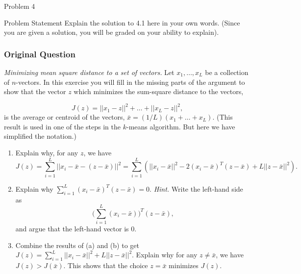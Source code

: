 \begin{problem}{Problem 4}
    \begin{statement}{Problem Statement}
        Explain the solution to 4.1  here in your own words. (Since you are given a solution, you will be graded on your ability to explain).

        \subsubsection*{Original Question}

        \textit{Minimizing mean square distance to a set of vectors.} Let $x_{1}, \dots, x_{L}$ be a collection of $n$-vectors. In this exercise you will fill in the missing parts of the argument to 
        show that the vector $z$ which minimizes the sum-square distance to the vectors,

        \begin{equation*}
            J(z) = ||x_{1} - z||^{2} + \dots + ||x_{L} - z||^{2},
        \end{equation*}
        is the average or centroid of the vectors, $\bar{x} = (1/L) (x_{1} + \dots + x_{L})$. (This result is used in one of the steps in the $k$-means algorithm. But here we have simplified the notation.)

        \begin{enumerate}[label = (\alph*)]
            \item Explain why, for any $z$, we have
            \begin{equation*}
                J(z) = \sum^{L}_{i = 1} ||x_{i} - \bar{x} - (z - \bar{x})||^{2} = \sum^{L}_{i = 1} (||x_{i} - \bar{x}||^{2} - 2(x_{i} - \bar{x})^{T}(z - \bar{x}) + L||z - \bar{x}||^{2}).
            \end{equation*}
            \item Explain why $\sum^{L}_{i = 1}(x_{i} - \bar{x})^{T}(z - \bar{x}) = 0$. \textit{Hint.} Write the left-hand side as 
            \begin{equation*}
                \Bigg(\sum^{L}_{i = 1} (x_{i} - \bar{x})\Bigg)^{T}(z - \bar{x}),
            \end{equation*}
            and argue that the left-hand vector is 0.
            \item Combine the results of (a) and (b) to get $J(z) = \sum^{L}_{i = 1}||x_{i} - \bar{x}||^{2} + L||z - \bar{x}||^{2}$. Explain why for any $z \neq \bar{x}$, we have $J(z) > J(\bar{x})$. This shows
            that the choice $z = \bar{x}$ minimizes $J(z)$.
        \end{enumerate}
    \end{statement}


\end{problem}
